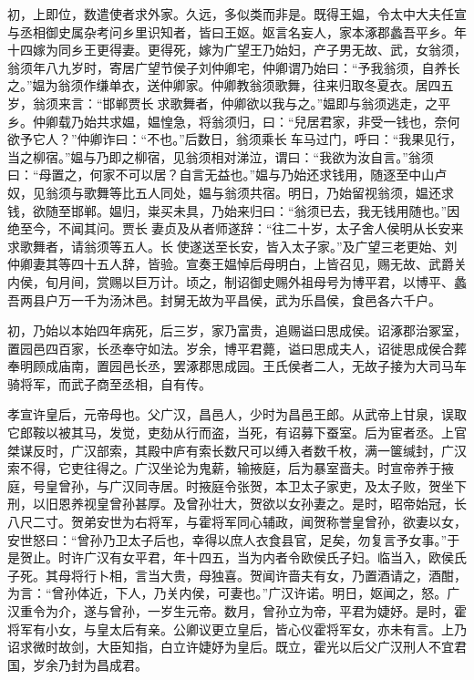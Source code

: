 \documentclass[12pt,UTF8]{ctexbook}
\begin{document}
初，上即位，数遣使者求外家。久远，多似类而非是。既得王媪，令太中大夫任宣与丞相御史属杂考问乡里识知者，皆曰王妪。妪言名妄人，家本涿郡蠡吾平乡。年十四嫁为同乡王更得妻。更得死，嫁为广望王乃始妇，产子男无故、武，女翁须，翁须年八九岁时，寄居广望节侯子刘仲卿宅，仲卿谓乃始曰：“予我翁须，自养长之。”媪为翁须作缣单衣，送仲卿家。仲卿教翁须歌舞，往来归取冬夏衣。居四五岁，翁须来言：“邯郸贾长求歌舞者，仲卿欲以我与之。”媪即与翁须逃走，之平乡。仲卿载乃始共求媪，媪惶急，将翁须归，曰：“兒居君家，非受一钱也，奈何欲予它人？”仲卿诈曰：“不也。”后数日，翁须乘长车马过门，呼曰：“我果见行，当之柳宿。”媪与乃即之柳宿，见翁须相对涕泣，谓曰：“我欲为汝自言。”翁须曰：“母置之，何家不可以居？自言无益也。”媪与乃始还求钱用，随逐至中山卢奴，见翁须与歌舞等比五人同处，媪与翁须共宿。明日，乃始留视翁须，媪还求钱，欲随至邯郸。媪归，粜买未具，乃始来归曰：“翁须已去，我无钱用随也。”因绝至今，不闻其问。贾长妻贞及从者师遂辞：“往二十岁，太子舍人侯明从长安来求歌舞者，请翁须等五人。长使遂送至长安，皆入太子家。”及广望三老更始、刘仲卿妻其等四十五人辞，皆验。宣奏王媪悼后母明白，上皆召见，赐无故、武爵关内侯，旬月间，赏赐以巨万计。顷之，制诏御史赐外祖母号为博平君，以博平、蠡吾两县户万一千为汤沐邑。封舅无故为平昌侯，武为乐昌侯，食邑各六千户。



初，乃始以本始四年病死，后三岁，家乃富贵，追赐谥曰思成侯。诏涿郡治冢室，置园邑四百家，长丞奉守如法。岁余，博平君薨，谥曰思成夫人，诏徙思成侯合葬奉明顾成庙南，置园邑长丞，罢涿郡思成园。王氏侯者二人，无故子接为大司马车骑将军，而武子商至丞相，自有传。



孝宣许皇后，元帝母也。父广汉，昌邑人，少时为昌邑王郎。从武帝上甘泉，误取它郎鞍以被其马，发觉，吏劾从行而盗，当死，有诏募下蚕室。后为宦者丞。上官桀谋反时，广汉部索，其殿中庐有索长数尺可以缚入者数千枚，满一箧缄封，广汉索不得，它吏往得之。广汉坐论为鬼薪，输掖庭，后为暴室啬夫。时宣帝养于掖庭，号皇曾孙，与广汉同寺居。时掖庭令张贺，本卫太子家吏，及太子败，贺坐下刑，以旧恩养视皇曾孙甚厚。及曾孙壮大，贺欲以女孙妻之。是时，昭帝始冠，长八尺二寸。贺弟安世为右将军，与霍将军同心辅政，闻贺称誉皇曾孙，欲妻以女，安世怒曰：“曾孙乃卫太子后也，幸得以庶人衣食县官，足矣，勿复言予女事。”于是贺止。时许广汉有女平君，年十四五，当为内者令欧侯氏子妇。临当入，欧侯氏子死。其母将行卜相，言当大贵，母独喜。贺闻许啬夫有女，乃置酒请之，酒酣，为言：“曾孙体近，下人，乃关内侯，可妻也。”广汉许诺。明日，妪闻之，怒。广汉重令为介，遂与曾孙，一岁生元帝。数月，曾孙立为帝，平君为婕妤。是时，霍将军有小女，与皇太后有亲。公卿议更立皇后，皆心仪霍将军女，亦未有言。上乃诏求微时故剑，大臣知指，白立许婕妤为皇后。既立，霍光以后父广汉刑人不宜君国，岁余乃封为昌成君。
\end{document}
